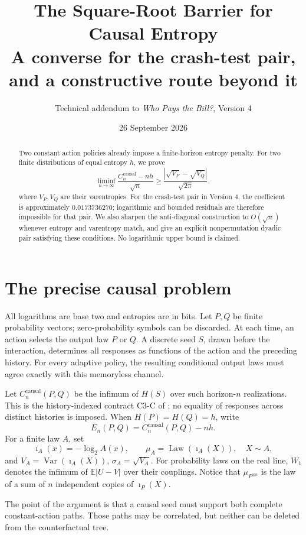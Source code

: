\documentclass[11pt,a4paper]{article}
\title{The Square-Root Barrier for Causal Entropy\\[3pt]
\large A converse for the crash-test pair, and a constructive route beyond it}
\author{Technical addendum to \emph{Who Pays the Bill?}, Version 4}
\date{26 September 2026}
\newcommand{\E}{\mathbb E}
\newcommand{\Law}{\operatorname{Law}}
\newcommand{\Var}{\operatorname{Var}}
\newcommand{\causal}{\mathrm{causal}}
\newcommand{\ii}{\imath}
\begin{document}
\maketitle
\begin{abstract}
Two constant action policies already impose a finite-horizon entropy penalty.
For two finite distributions of equal entropy $h$, we prove
\[
\liminf_{n\to\infty}\frac{C_n^{\causal}-nh}{\sqrt n}
\ge \frac{|\sqrt{V_P}-\sqrt{V_Q}|}{\sqrt{2\pi}},
\]
where $V_P,V_Q$ are their varentropies. For the crash-test pair in Version 4,
the coefficient is approximately $0.0173736270$; logarithmic and bounded
residuals are therefore impossible for that pair. We also sharpen the
anti-diagonal construction to $O(\sqrt n)$ whenever entropy and varentropy
match, and give an explicit nonpermutation dyadic pair satisfying these
conditions. No logarithmic upper bound is claimed.
\end{abstract}

\section{The precise causal problem}
All logarithms are base two and entropies are in bits. Let $P,Q$ be finite
probability vectors; zero-probability symbols can be discarded. At each time,
an action selects the output law $P$ or $Q$. A discrete seed $S$, drawn before
the interaction, determines all responses as functions of the action and
the preceding history. For every adaptive policy, the resulting conditional
output laws must agree exactly with this memoryless channel.

Let $C_n^{\causal}(P,Q)$ be the infimum of $H(S)$ over such horizon-$n$
realizations. This is the history-indexed contract C3-C of \cite{mikulik};
no equality of responses across distinct histories is imposed.
When $H(P)=H(Q)=h$, write
\[
E_n(P,Q)=C_n^{\causal}(P,Q)-nh.
\]
For a finite law $A$, set
\[
\ii_A(x)=-\log_2 A(x),\qquad
\mu_A=\Law(\ii_A(X)),\quad X\sim A,
\]
and $V_A=\Var(\ii_A(X))$, $\sigma_A=\sqrt{V_A}$.
For probability laws on the real line, $W_1$ denotes the infimum of
$\E|U-V|$ over their couplings. Notice that
$\mu_{P^{\otimes n}}$ is the law of a sum of $n$ independent copies of
$\ii_P(X)$.

The point of the argument is that a causal seed must support both complete
constant-action paths. Those paths may be correlated, but neither can be
deleted from the counterfactual tree.
\end{document}
